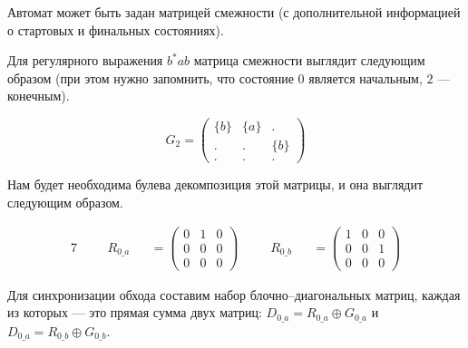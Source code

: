 \begin{example}
Автомат может быть задан матрицей смежности (с дополнительной информацией о стартовых и финальных состояниях).

Для регулярного выражения $b^*ab$ матрица смежности выглядит следующим образом (при этом нужно запомнить, что
состояние $0$ является начальным, $2$ --- конечным).

\[ G_2 =
\begin{pmatrix}
\{b\} & \{a\} & . \\
. & . & \{b\} \\
. & . & . 
\end{pmatrix}
\]

Нам будет необходима булева декомпозиция этой матрицы, и она выглядит следующим образом.

\begin{alignat*}{7}
  & &&R_{0\_a} &&= \begin{pmatrix}
    0 & 1 & 0 \\
    0 & 0 & 0 \\
    0 & 0 & 0 
    \end{pmatrix} \ \ \ \ &&R_{0\_b} &&= \begin{pmatrix}
      1 & 0 & 0 \\
      0 & 0 & 1 \\
      0 & 0 & 0 
      \end{pmatrix}
\end{alignat*}

Для синхронизации обхода составим набор блочно--диагональных матриц, каждая из которых --- это прямая сумма двух матриц:
$D_{0\_a} = R_{0\_a} \oplus G_{0\_a}$ и $D_{0\_a} = R_{0\_b} \oplus G_{0\_b}$.


\end{example}
